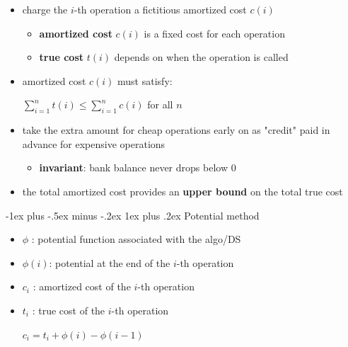 \documentclass[10pt,landscape]{article}
\makeatletter
\newcommand{\subsubsubsection}{\@startsection{subsubsection}{3}{0mm}%
                                {-1ex plus -.5ex minus -.2ex}%
                                {1ex plus .2ex}%
                                {\normalfont\scriptsize\bfseries}}
\newcommand{\1}{\mathmybb{1}}
\newenvironment{tightcenter}{%
  \setlength\topsep{0pt}
  \setlength\parskip{0pt}
  \begin{center}
    }{%
  \end{center}
}
\makeatother
\begin{document}
\begin{multicols*}{3}
\begin{itemize}[topsep=0pt,noitemsep,wide=0pt, leftmargin=\dimexpr{} + 2\relax]
  \item charge the $i$-th operation a fictitious amortized cost $c(i)$ 
    \begin{itemize}[topsep=0pt,noitemsep,wide=0pt, leftmargin=\dimexpr{} + 2\relax]
      \item \textbf{amortized cost} $c(i)$ is a fixed cost for each operation
      \item \textbf{true cost} $t(i)$ depends on when the operation is called
    \end{itemize}
  \item amortized cost $c(i)$ must satisfy:
    \begin{tightcenter}
      $\sum^n_{i=1} t(i) \leq \sum^n_{i=1} c(i) $ for all $n$
    \end{tightcenter}
  \item take the extra amount for cheap operations early on as "credit" paid in advance for expensive operations
    \begin{itemize}[topsep=0pt,noitemsep,wide=0pt, leftmargin=\dimexpr{} + 2\relax]
      \item \textbf{invariant}: bank balance never drops below 0
    \end{itemize}
  \item the total amortized cost provides an \textbf{upper bound} on the total true cost
\end{itemize}

\subsubsubsection{Potential method}

\begin{itemize}[topsep=0pt,noitemsep,wide=0pt, leftmargin=\dimexpr{} + 2\relax]
  \item $\phi$ : potential function associated with the algo/DS
  \item $\phi(i)$: potential at the end of the $i $-th operation
  \item $c_i$ : amortized cost of the $i$-th operation
  \item $t_i$ : true cost of the $i$-th operation
    \begin{tightcenter}
      $c_i = t_i + \phi(i) - \phi(i-1)$ 


\end{tightcenter}
\end{itemize}
\end{multicols*}
\end{document}
